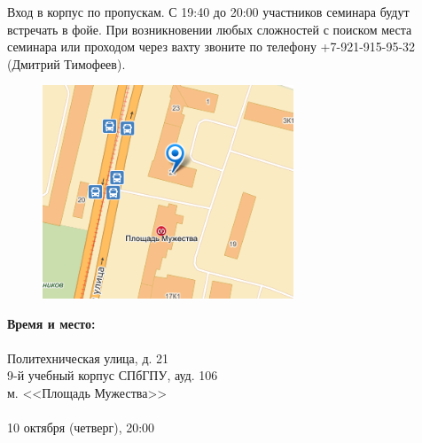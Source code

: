 \documentclass[12pt]{article}
\begin{document}
Вход в корпус по пропускам. С 19:40 до 20:00 участников семинара будут встречать в фойе. При возникновении любых сложностей с поиском места семинара или проходом через вахту звоните по телефону +7-921-915-95-32 (Дмитрий Тимофеев).\\

\begin{minipage}{0.5\textwidth}
\begin{figure}[H]
\includegraphics[width=7.5cm]{map.png} 
\end{figure}
\end{minipage} \hfill
\begin{minipage}{0.45\textwidth}
\textbf{Время и место:}\\
\\
Политехническая улица, д. 21\\
9-й учебный корпус СПбГПУ, ауд. 106\\
м. <<Площадь Мужества>>\\
\\
10 октября (четверг), 20:00\\
\end{minipage}
\end{document}
